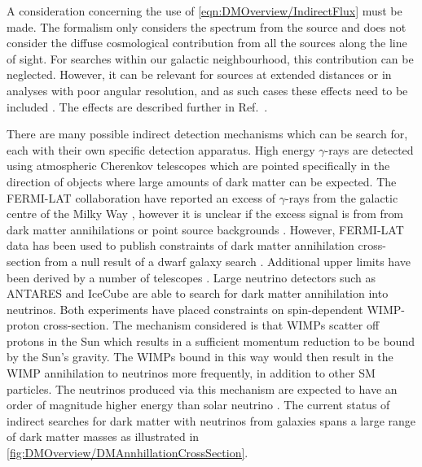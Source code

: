 A consideration concerning the use of \autoref{eqn:DMOverview/IndirectFlux} must be made. The formalism only considers the spectrum from the source and does not consider the diffuse
cosmological contribution from all the sources along the line of sight. For searches within our galactic neighbourhood, this contribution can be neglected. However, it can be relevant for sources at extended distances or in analyses with poor angular resolution, and as such cases these effects need to be included \cite{PerezdelosHeros:2020qyt}. The effects are described further in Ref.~\cite{Beacom:2006tt,Ullio:2002pj}.

There are many possible indirect detection mechanisms which can be search for, each with their own specific detection apparatus.
High energy $\gamma$-rays are detected using atmospheric Cherenkov telescopes which are pointed specifically in the direction of objects where large amounts of dark matter can be expected. The FERMI-LAT collaboration have reported an excess of $\gamma$-rays from the galactic centre of the Milky Way \cite{Fermi-LAT:2015sau}, however it is unclear if the excess signal is from from dark matter annihilations or point source backgrounds \cite{Boyarsky_2011}. However, FERMI-LAT data has been used to publish constraints of dark matter annihilation cross-section from a null result of a dwarf galaxy search \cite{Fermi-LAT:2015ycq}. Additional upper limits have been derived by a number of telescopes \cite{Aleksic:2013xea,HESS:2014zqa,VERITAS:2017tif}. 
Large neutrino detectors such as ANTARES \cite{ANTARES:2016xuh} and IceCube \cite{IceCube:2009iyf} are able to search for dark matter annihilation into neutrinos. Both experiments have placed constraints on spin-dependent WIMP-proton cross-section. The mechanism considered is that WIMPs scatter off protons in the Sun which results in a sufficient momentum reduction to be bound by the Sun's gravity. The WIMPs bound in this way would then result in the WIMP annihilation to neutrinos more frequently, in addition to other SM particles. The neutrinos produced via this mechanism are expected to have an order of magnitude higher energy than solar neutrino \cite{Hooper:2025ohk,Super-Kamiokande:2020sgt}. The current status of indirect searches for dark matter with neutrinos from galaxies spans a large range of dark matter masses as illustrated in \autoref{fig:DMOverview/DMAnnhillationCrossSection}.
